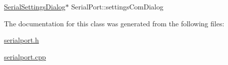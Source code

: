 \mbox{\label{classSerialPort_a9ab445f818748122d3368fd2e9dbbbea}} 
{\footnotesize\ttfamily \mbox{\hyperlink{classSerialSettingsDialog}{Serial\+Settings\+Dialog}}$\ast$ Serial\+Port\+::\texorpdfstring{settings\+Com\+Dialog}{settingsComDialog}\hspace{0.3cm}{\ttfamily [private]}}



The documentation for this class was generated from the following files\+:\begin{DoxyCompactItemize}
\item 
\mbox{\hyperlink{serialport_8h}{serialport.\+h}}\item 
\mbox{\hyperlink{serialport_8cpp}{serialport.\+cpp}}\end{DoxyCompactItemize}
\newpage